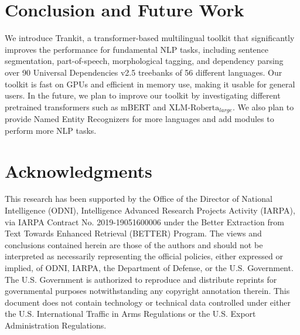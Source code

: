 \documentclass[11pt,a4paper]{article}
\begin{document}
\section{Conclusion and Future Work}
We introduce Trankit, a transformer-based multilingual toolkit that significantly improves the performance for fundamental NLP tasks, including sentence segmentation, part-of-speech, morphological tagging, and dependency parsing over 90 Universal Dependencies v2.5 treebanks of 56 different languages. Our toolkit is fast on GPUs and efficient in memory use, making it usable for general users. In the future, we plan to improve our toolkit by investigating different pretrained transformers such as mBERT and $\textrm{XLM-Roberta}_{large}$. We also plan to provide Named Entity Recognizers for more languages and add modules to perform more NLP tasks.



\section*{Acknowledgments}


This research has been supported by the Office of the Director of National Intelligence (ODNI), Intelligence Advanced Research Projects Activity (IARPA), via IARPA Contract No. 2019-19051600006 under the Better Extraction from Text Towards Enhanced Retrieval (BETTER) Program. The views and conclusions contained herein are those of the authors and should not be interpreted as necessarily representing the official policies, either expressed or implied, of ODNI, IARPA, the Department of Defense, or the U.S. Government. The U.S. Government is authorized to reproduce and distribute reprints for governmental purposes notwithstanding any copyright annotation therein. This document does not contain technology or technical data controlled under either the U.S. International Traffic in Arms Regulations or the U.S. Export Administration Regulations.



\end{document}
